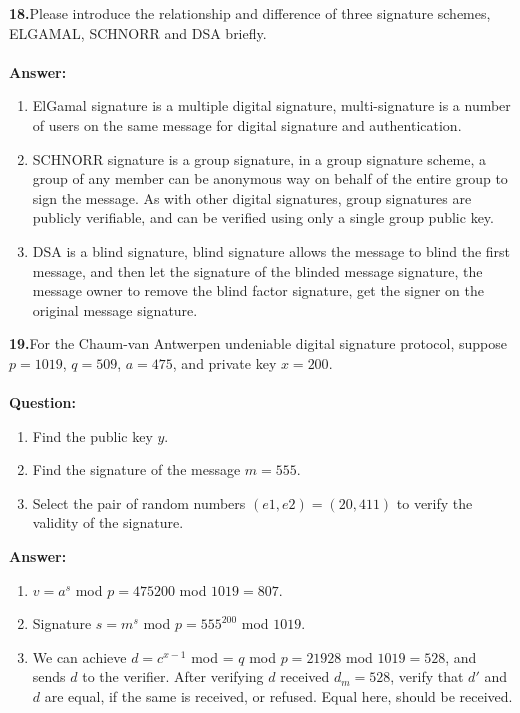\documentclass[paper=a4, fontsize=11pt]{scrartcl} %
\numberwithin{equation}{section} %
\numberwithin{figure}{section} %
\numberwithin{table}{section} %
\begin{document}
\textbf{18.}Please introduce the relationship and difference of three signature schemes, ELGAMAL, SCHNORR and DSA briefly.
\\
\\
\textbf{Answer:}
\begin{enumerate}
\item ElGamal signature is a multiple digital signature, multi-signature is a number of users on the same message for digital signature and authentication.
\item SCHNORR signature is a group signature, in a group signature scheme, a group of any member can be anonymous way on behalf of the entire group to sign the message. As with other digital signatures, group signatures are publicly verifiable, and can be verified using only a single group public key.
\item DSA is a blind signature, blind signature allows the message to blind the first message, and then let the signature of the blinded message signature, the message owner to remove the blind factor signature, get the signer on the original message signature.
\end{enumerate}

\textbf{19.}For the Chaum-van Antwerpen undeniable digital signature protocol, suppose $p = 1019$, $q = 509$, $a = 475$, and private key $x = 200$.
\\
\\
\textbf{Question:}
\begin{enumerate}
\item Find the public key $y$.
\item Find the signature of the message $m = 555$.
\item Select the pair of random numbers $(e1, e2) = (20, 411)$ to verify the validity of the signature.
\end{enumerate}

\textbf{Answer:}
\begin{enumerate}
\item $v=a^s$ mod $p=475200$ mod $1019=807$.
\item Signature $s = m^s$ mod $p = 555^{200}$ mod $1019$.
\item We can achieve $d = c^{x-1}$ mod = $q$ mod $p = 21928$ mod $1019 = 528$, and sends $d$ to the verifier. After verifying $d$ received $d_m  = 528$, verify that $d'$ and $d$ are equal, if the same is received, or refused. Equal here, should be received.
\end{enumerate}
\end{document}
